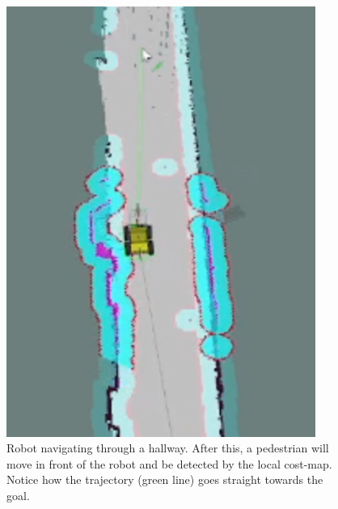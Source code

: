 \begin{figure}[H]
  \centering
  \begin{minipage}[b]{0.49\textwidth}
        \centering
        \includegraphics[width = 0.9\textwidth]{Figures/figuiaCollisionAvoid3.png}
        \caption{Robot navigating through a hallway. After this, a pedestrian will move in front of the robot and be detected by the local cost-map. Notice how the trajectory (green line) goes straight towards the goal.}
        \label{fig:R:AN:N:CA:CollisionAvoidance1}
  \end{minipage}
  \hfill
  \begin{minipage}[b]{0.49\textwidth}
    \centering

\end{minipage}
\end{figure}
